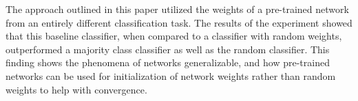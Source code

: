\documentclass[conference,11pt]{IEEEtran}
\begin{document}
The approach outlined in this paper utilized the weights of a pre-trained network from an entirely different classification task. The results of the experiment showed that this baseline classifier, when compared to a classifier with random weights, outperformed a majority class classifier as well as the random classifier. This finding shows the phenomena of networks generalizable, and how pre-trained networks can be used for initialization of network weights rather than random weights to help with convergence.




\end{document}
